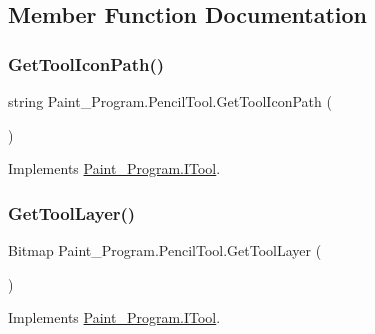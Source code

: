 \subsection{Member Function Documentation}
\mbox{\label{class_paint___program_1_1_pencil_tool_a91c7f9e9bd173b3f859cbc37f44c4f48}} 
\subsubsection{\texorpdfstring{Get\+Tool\+Icon\+Path()}{GetToolIconPath()}}
{\footnotesize\ttfamily string Paint\+\_\+\+Program.\+Pencil\+Tool.\+Get\+Tool\+Icon\+Path (\begin{DoxyParamCaption}{ }\end{DoxyParamCaption})\hspace{0.3cm}{\ttfamily [inline]}}



Implements \mbox{\hyperlink{interface_paint___program_1_1_i_tool_aa057d2f99c59d7bec0215dcad2da1b72}{Paint\+\_\+\+Program.\+I\+Tool}}.

\mbox{\label{class_paint___program_1_1_pencil_tool_acef50de4028855c4a6be1ff9f63f9b3b}} 
\subsubsection{\texorpdfstring{Get\+Tool\+Layer()}{GetToolLayer()}}
{\footnotesize\ttfamily Bitmap Paint\+\_\+\+Program.\+Pencil\+Tool.\+Get\+Tool\+Layer (\begin{DoxyParamCaption}{ }\end{DoxyParamCaption})\hspace{0.3cm}{\ttfamily [inline]}}



Implements \mbox{\hyperlink{interface_paint___program_1_1_i_tool_a9b057905515f42a988c166a6a40318e0}{Paint\+\_\+\+Program.\+I\+Tool}}.

